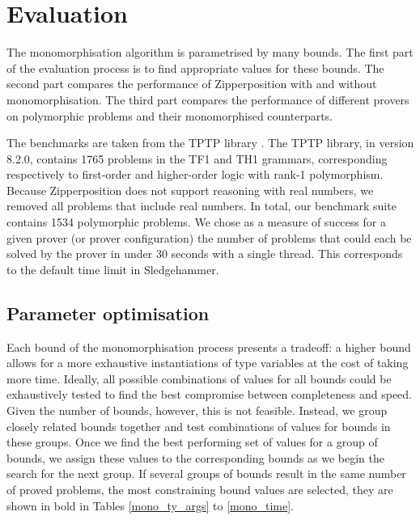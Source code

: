 \documentclass[]{ceurart}
\begin{document}
\section{Evaluation}
\label{sec:evaluation}

The monomorphisation algorithm is parametrised by many bounds. The first part of the evaluation process is to find appropriate values for these bounds. The second part compares the performance of Zipperposition with and without monomorphisation. The third part compares the performance of different provers on polymorphic problems and their monomorphised counterparts.

The benchmarks are taken from the TPTP library \cite{tptp}. The TPTP library, in version 8.2.0, contains 1765 problems in the TF1 and TH1 grammars, corresponding respectively to first-order and higher-order logic with rank-1 polymorphism. Because Zipperposition does not support reasoning with real numbers, we removed all problems that include real numbers. In total, our benchmark suite contains 1534 polymorphic problems. We chose as a measure of success for a given prover (or prover configuration) the number of problems that could each be solved by the prover in under 30 seconds with a single thread. This corresponds to the default time limit in Sledgehammer.

\subsection{Parameter optimisation}
\label{param_opti}

Each bound of the monomorphisation process presents a tradeoff: a higher bound allows for a more exhaustive instantiations of type variables at the cost of taking more time. Ideally, all possible combinations of values for all bounds could be exhaustively tested to find the best compromise between completeness and speed. Given the number of bounds, however, this is not feasible. Instead, we group closely related bounds together and test combinations of values for bounds in these groups. Once we find the best performing set of values for a group of bounds, we assign these values to the corresponding bounds as we begin the search for the next group. If several groups of bounds result in the same number of proved problems, the most constraining bound values are selected, they are shown in bold in Tables \ref{mono_ty_args} to \ref{mono_time}.
\end{document}
